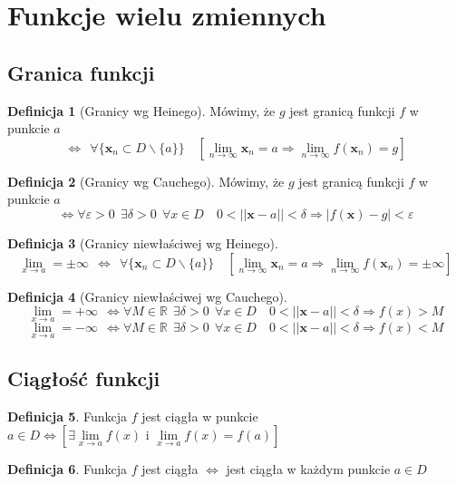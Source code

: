 \documentclass[12pt,a4paper]{article}
\theoremstyle{definition}
\newtheorem{df}{Definicja}
\begin{document}
\section{Funkcje wielu zmiennych}
\subsection{Granica funkcji}
\begin{df}[Granicy wg Heinego]
Mówimy, że $g$ jest granicą funkcji $f$ w punkcie $a$
$$\Leftrightarrow ~~\forall \{\mathbf{x}_n \subset D \smallsetminus \{a\} \} \quad [\lim\limits_{n\to\infty}\mathbf{x}_n = a \Rightarrow \lim\limits_{n\to\infty}f(\mathbf{x}_n)=g]$$
\end{df}
\begin{df}[Granicy wg Cauchego]
Mówimy, że $g$ jest granicą funkcji $f$ w punkcie $a$
$$\Leftrightarrow \forall\varepsilon >0 ~~\exists \delta >0 ~~\forall x\in D \quad 0<||\mathbf{x} - a|| <\delta \Rightarrow |f(\mathbf{x})-g| < \varepsilon$$
\end{df}
\begin{df}[Granicy niewłaściwej wg Heinego]
$$\lim\limits_{x\to a} = \pm \infty~~\Leftrightarrow ~~\forall \{\mathbf{x}_n \subset D \smallsetminus \{a\} \} \quad [\lim\limits_{n\to\infty}\mathbf{x}_n = a \Rightarrow \lim\limits_{n\to\infty}f(\mathbf{x}_n)=\pm\infty]$$
\end{df}
\begin{df}[Granicy niewłaściwej wg Cauchego]
$$\lim\limits_{x\to a} = +\infty~~\Leftrightarrow \forall M\in\mathbb{R}~~\exists \delta >0 ~~\forall x\in D \quad 0<||\mathbf{x} - a|| <\delta \Rightarrow f(x) > M$$
$$\lim\limits_{x\to a} = -\infty~~\Leftrightarrow \forall M\in\mathbb{R}~~\exists \delta >0 ~~\forall x\in D \quad 0<||\mathbf{x} - a|| <\delta \Rightarrow f(x) < M$$
\end{df}

\subsection{Ciągłość funkcji}
\begin{df}
Funkcja $f$ jest ciągła w punkcie $a\in D \Leftrightarrow [\exists \lim\limits_{x\to a}f(x) \text{ i } \lim\limits_{x\to a}f(x) = f(a)]$ 
\end{df}
\begin{df}
Funkcja $f$ jest ciągła $\Leftrightarrow$ jest ciągła w każdym punkcie $a\in D$
\end{df}
\end{document}
